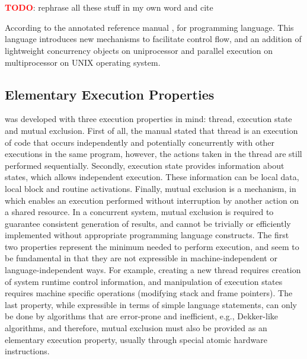 \chapter{\uCPP} \label{uCPP}

\textbf{\textcolor{red}{TODO}}: rephrase all these stuff in my own word and cite

According to the \uCPPS annotated reference manual \cite{reference10}, \uCPPS
for \CCS programming language. This language introduces new mechanisms to facilitate
control flow, and an addition of lightweight concurrency objects on
uniprocessor and parallel execution on multiprocessor on UNIX operating
system.

\section{Elementary Execution Properties}
\uCPPS was developed with three execution properties in mind: thread,
execution state and mutual exclusion. First of all, the manual stated that
thread is an execution of code that occurs independently and potentially
concurrently with other executions in the same program, however, the actions
taken in the thread are still performed sequentially. Secondly, execution state
provides information about states, which allows independent execution. These
information can be local data, local block and routine activations. Finally,
mutual exclusion is a mechanism, in which enables an execution performed without
interruption by another action on a shared resource. In a concurrent system, mutual exclusion is required to guarantee consistent
generation
of results, and cannot be trivially or efficiently implemented without
appropriate programming language
constructs.
The first two properties represent the minimum needed to perform execution, and
seem to be fundamental in that
they are not expressible in machine-independent or language-independent ways.
For example, creating a new thread
requires creation of system runtime control information, and manipulation of
execution states requires machine specific
operations (modifying stack and frame pointers). The last property, while
expressible in terms of simple language
statements, can only be done by algorithms that are error-prone and inefficient,
e.g., Dekker-like algorithms, and
therefore, mutual exclusion must also be provided as an elementary execution
property, usually through special atomic
hardware instructions.

